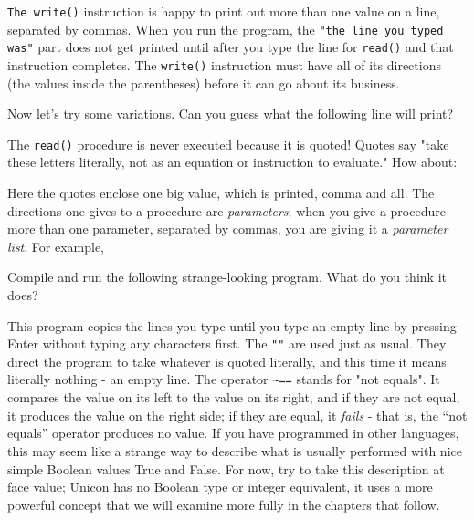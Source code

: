 \texttt{The }\texttt{write()} instruction is happy to print out more
than one value on a line, separated by commas. When you run the
program, the \texttt{"the line you typed
was"} part does not get printed until after you type the
line for \texttt{read()} and that instruction completes. The
\texttt{write()} instruction must have all of its directions (the
values inside the parentheses) before it can go about its business.

Now let's try some variations. Can you guess what the
following line will print?


The \texttt{read()} procedure is never executed because it is quoted!
Quotes say "take these letters literally, not
as an equation or instruction to evaluate." How about:


\noindent Here the quotes enclose one big value, which is printed, comma
and all. The directions one gives to a procedure are
\textit{parameters}; when you give a procedure more than one parameter,
separated by commas, you are giving it a
\textit{parameter list}. For example,


\noindent Compile and run the following strange-looking program.
What do you think it does?


This program copies the lines you type until you type an empty line by
pressing Enter without typing any characters first. The
\texttt{""} are used just as usual. They
direct the program to take whatever is quoted literally, and this time
it means literally nothing - an empty line. The operator
\texttt{\~{}==} stands for "not
equals". It compares the value on its left to the value
on its right, and if they are not equal, it produces the value on the
right side; if they are equal, it \textit{fails} - that is, the {\textquotedblleft}not
equals{\textquotedblright} operator produces no value. If you have
programmed in other languages, this may seem like a strange way to
describe what is usually performed with nice simple Boolean values True
and False. For now, try to take this description at face value; Unicon
has no Boolean type or integer equivalent, it uses a more powerful
concept that we will examine more fully in the chapters that follow.

